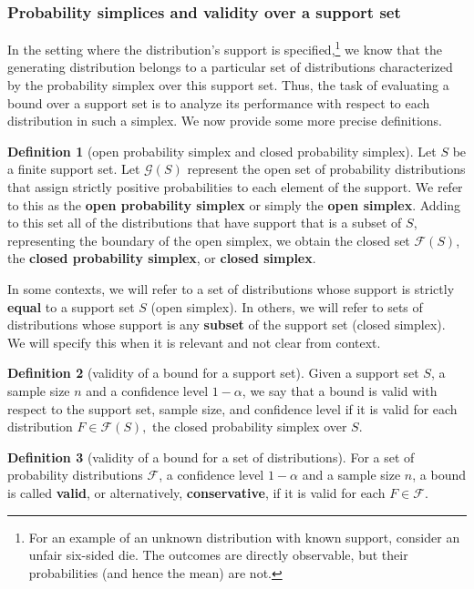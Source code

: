 \documentclass{article}
\theoremstyle{definition}
\newtheorem{definition}{Definition}[section]
\theoremstyle{remark}
\begin{document}
\subsubsection{Probability simplices and validity over a support set}
In the setting where the distribution's support is specified,\footnote{For  an example of an unknown distribution with known support, consider an unfair six-sided die. The outcomes are directly observable, but their probabilities (and hence the mean) are not.} we know that the generating distribution belongs to a particular set of distributions characterized by the probability simplex over this support set. Thus, the task of evaluating a bound over a support set is to analyze its performance with respect to each distribution in such a simplex. We now provide some more precise definitions.  
\begin{definition}[open probability simplex and closed probability simplex]
Let $S$ be a finite support set. Let $\mathcal{G}(S)$ represent the open set of probability distributions that assign strictly positive probabilities to each element of the support. We refer to this as the \textbf{open probability simplex} or simply the \textbf{open simplex}. Adding to this set all of the distributions that have support that is a subset of $S$, representing the boundary of the open simplex, we obtain the closed set $\mathcal{F}(S)$, the \textbf{closed probability simplex}, or \textbf{closed simplex}. 
\end{definition}
In some contexts, we will refer to a set of distributions whose support is strictly \textbf{equal} to a support set $S$ (open simplex). In others, we will refer to sets of distributions whose support is any \textbf{subset} of the support set (closed simplex). We will specify this when it is relevant and not clear from context.

\begin{definition}[validity of a bound for a support set]
Given a support set $S$, a sample size $n$ and a confidence level $1-\alpha$, we say that a bound is valid with respect to the support set, sample size, and confidence level if it is valid for each distribution $F\in \mathcal{F}(S),$ the closed probability simplex over $S$.
\end{definition}

\begin{definition}[validity of a bound for a set of distributions]
\label{def:validity_for_dists}
For a set of probability distributions $\mathcal{F}$, a confidence level $1-\alpha$ and a sample size $n$, a bound is called {\bf valid}, or alternatively, {\bf conservative}, if  it is valid for each  $F\in\mathcal{F}$. 
\end{definition}
\end{document}
